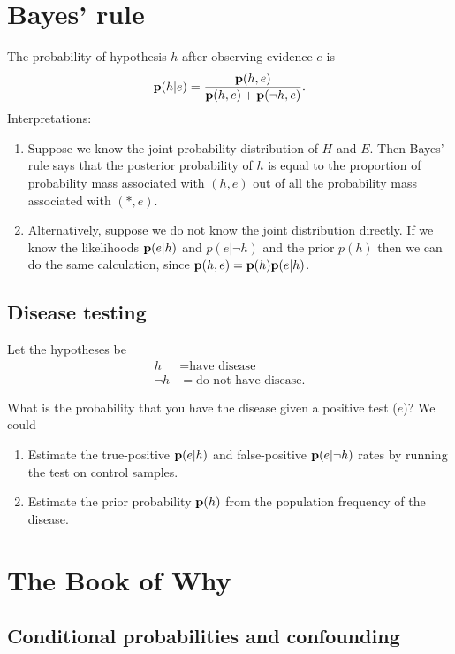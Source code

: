 \section{Bayes' rule}

The probability of hypothesis $h$ after observing evidence $e$ is
\begin{align*}
  \mathbf{p}(h | e)
  = \frac{\mathbf{p}(h, e)}{\mathbf{p}(h, e) + \mathbf{p}(\neg h, e)}.
\end{align*}
Interpretations:
\begin{enumerate}
\item Suppose we know the joint probability distribution of $H$ and $E$. Then Bayes' rule says that the posterior
  probability of $h$ is equal to the proportion of probability mass associated with $(h, e)$ out of all the
  probability mass associated with $(*, e)$.

\item Alternatively, suppose we do not know the joint distribution directly. If we know the likelihoods
  $\mathbf{p}(e|h)$ and $p(e|\neg h)$ and the prior $p(h)$ then we can do the same calculation, since $\mathbf{p}(h, e) = \mathbf{p}(h)\mathbf{p}(e | h)$.
\end{enumerate}

\subsection{Disease testing}

Let the hypotheses be
\begin{align*}
  h      &= \text{have disease} \\
  \neg h &= \text{do not have disease}.
\end{align*}

What is the probability that you have the disease given a positive test ($e$)? We could
\begin{enumerate}
\item Estimate the true-positive $\mathbf{p}(e|h)$ and false-positive $\mathbf{p}(e|\neg h)$ rates by running the test on control samples.
\item Estimate the prior probability $\mathbf{p}(h)$ from the population frequency of the disease.
\end{enumerate}


\section{The Book of Why}

\subsection{Conditional probabilities and confounding}


